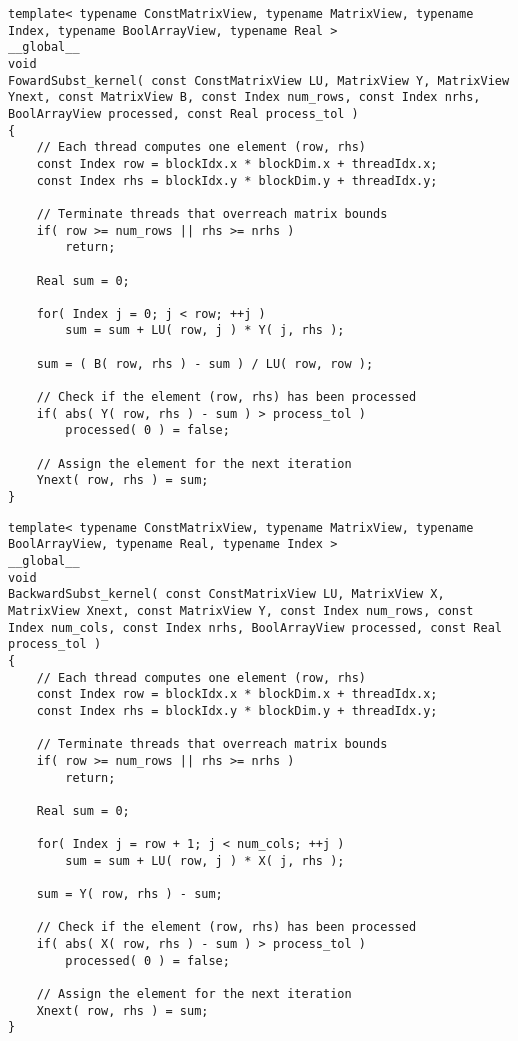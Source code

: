 \begin{lstlisting}[caption={The implementation of the \code{FowardSubst\_kernel()} kernel which computes one forward-substitution iteration.},label={Listing:ISxPP-implementation->kernels->forward-substitution}]
template< typename ConstMatrixView, typename MatrixView, typename Index, typename BoolArrayView, typename Real >
__global__
void
FowardSubst_kernel( const ConstMatrixView LU, MatrixView Y, MatrixView Ynext, const MatrixView B, const Index num_rows, const Index nrhs, BoolArrayView processed, const Real process_tol )
{
	// Each thread computes one element (row, rhs)
	const Index row = blockIdx.x * blockDim.x + threadIdx.x;
	const Index rhs = blockIdx.y * blockDim.y + threadIdx.y;
	
	// Terminate threads that overreach matrix bounds
	if( row >= num_rows || rhs >= nrhs )
		return;
	
	Real sum = 0;
	
	for( Index j = 0; j < row; ++j )
		sum = sum + LU( row, j ) * Y( j, rhs );
	
	sum = ( B( row, rhs ) - sum ) / LU( row, row );
	
	// Check if the element (row, rhs) has been processed
	if( abs( Y( row, rhs ) - sum ) > process_tol )
		processed( 0 ) = false;
	
	// Assign the element for the next iteration
	Ynext( row, rhs ) = sum;
}
\end{lstlisting}

\begin{lstlisting}[caption={The implementation of the \code{BackwardSubst\_kernel()} kernel which computes one backward-substitution iteration.},label={Listing:ISxPP-implementation->kernels->backward-substitution}]
template< typename ConstMatrixView, typename MatrixView, typename BoolArrayView, typename Real, typename Index >
__global__
void
BackwardSubst_kernel( const ConstMatrixView LU, MatrixView X, MatrixView Xnext, const MatrixView Y, const Index num_rows, const Index num_cols, const Index nrhs, BoolArrayView processed, const Real process_tol )
{
	// Each thread computes one element (row, rhs)
	const Index row = blockIdx.x * blockDim.x + threadIdx.x;
	const Index rhs = blockIdx.y * blockDim.y + threadIdx.y;
	
	// Terminate threads that overreach matrix bounds
	if( row >= num_rows || rhs >= nrhs )
		return;
	
	Real sum = 0;
	
	for( Index j = row + 1; j < num_cols; ++j )
		sum = sum + LU( row, j ) * X( j, rhs );
	
	sum = Y( row, rhs ) - sum;
	
	// Check if the element (row, rhs) has been processed
	if( abs( X( row, rhs ) - sum ) > process_tol )
		processed( 0 ) = false;
	
	// Assign the element for the next iteration
	Xnext( row, rhs ) = sum;
}
\end{lstlisting}

